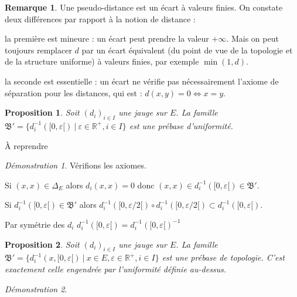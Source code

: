 \documentclass[a4paper, 11pt, french]{book}
\newenvironment{itemise}{\itemize}{\enditemize}
\let\colour=\color
\theoremstyle{plain} %
\newtheorem{proposition}{Proposition}
\theoremstyle{definition} %
\newtheorem{remarque}{Remarque}
\theoremstyle{remark} %
\newtheorem*{demonstration}{Démonstration}
\newcommand{\1}{\mathds{1}}
\newcommand{\inv}[1]{#1^{-1}}
\newcommand{\R}{\mathbb{R}}
\renewcommand{\frak}[1]{\mathfrak{#1}}
\newcommand\ens[2]{\{#1 \ |\ #2\}}
\begin{document}
\begin{remarque}
	Une pseudo-distance est un écart à valeurs finies.
	On constate deux différences par rapport à la notion de distance :
	\begin{itemise}
		\item la première est mineure : un écart peut prendre la valeur $+\infty$.
		Mais on peut toujours remplacer $d$ par un écart équivalent (du point de vue de la topologie et de la structure uniforme) à valeurs finies, par exemple $\min(1, d)$.
		\item la seconde est essentielle : un écart ne vérifie pas nécessairement l'axiome de séparation pour les distances, qui est : $d(x, y) = 0\iff x = y$.
	\end{itemise}
\end{remarque}

\begin{proposition}
	Soit $(d_i)_{i\in I}$ une jauge sur $E$.
	La famille $\frak{B}'=\ens{\inv{d_i}([0, \varepsilon[)}{\varepsilon\in\R^+, i\in I}$ est une prébase d'uniformité.
\end{proposition}

{\colour{red} À reprendre}

\begin{demonstration}
	Vérifions les axiomes.
	\begin{itemise}
		\item Si $(x, x)\in\Delta_E$ alors $d_i(x, x)=0$ donc $(x, x)\in\inv{d_i}([0, \varepsilon[)\in\frak{B}'$.
		\item Si $\inv{d_i}([0, \varepsilon[)\in\frak{B}'$ alors $\inv{d_i}([0, \varepsilon/2[)\circ \inv{d_i}([0, \varepsilon/2[)\subset\inv{d_i}([0, \varepsilon[)$.
		\item Par symétrie des $d_i$ $\inv{d_i}([0, \varepsilon[)=\inv{\inv{d_i}([0, \varepsilon[)}$
	\end{itemise}
\end{demonstration}

\begin{proposition}
	Soit $(d_i)_{i\in I}$ une jauge sur $E$.
	La famille $\frak{B}'=\ens{\inv{d_i}(x, [0, \varepsilon[)}{x\in E, \varepsilon\in\R^+, i\in I}$ est une prébase de topologie.
	C'est exactement celle engendrée par l'uniformité définie au-dessus.
\end{proposition}

\begin{demonstration}
	\colour{red}{À démontrer}
\end{demonstration}
\end{document}
